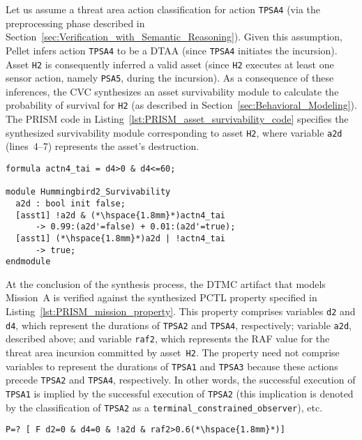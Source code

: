 Let us assume a threat area action classification for action \texttt{TPSA4} (via the preprocessing phase described in Section~\ref{sec:Verification_with_Semantic_Reasoning}). Given this assumption, Pellet infers action \texttt{TPSA4} to be a DTAA (since \texttt{TPSA4} initiates the incursion). Asset \texttt{H2} is consequently inferred a valid asset (since \texttt{H2} executes at least one sensor action, namely \texttt{PSA5}, during the incursion). As a consequence of these inferences, the CVC synthesizes an asset survivability module to calculate the probability of survival for \texttt{H2} (as described in Section~\ref{sec:Behavioral_Modeling}). The PRISM code in Listing~\ref{lst:PRISM_asset_survivability_code} specifies the synthesized survivability module corresponding to asset \texttt{H2}, where variable \texttt{a2d} (lines~4--7) represents the asset's destruction.

\begin{lstlisting}[caption={PRISM asset survivability code},label=lst:PRISM_asset_survivability_code]
formula actn4_tai = d4>0 & d4<=60;

module Hummingbird2_Survivability
  a2d : bool init false;
  [asst1] !a2d & (*\hspace{1.8mm}*)actn4_tai
      -> 0.99:(a2d'=false) + 0.01:(a2d'=true);
  [asst1] (*\hspace{1.8mm}*)a2d | !actn4_tai
      -> true;
endmodule
\end{lstlisting}

At the conclusion of the synthesis process, the DTMC artifact that models Mission~A is verified against the synthesized PCTL property specified in Listing~\ref{lst:PRISM_mission_property}. This property comprises variables \texttt{d2} and \texttt{d4}, which represent the durations of \texttt{TPSA2} and \texttt{TPSA4}, respectively; variable \texttt{a2d}, described above; and variable \texttt{raf2}, which represents the RAF value for the threat area incursion committed by asset~\texttt{H2}. The property need not comprise variables to represent the durations of \texttt{TPSA1} and \texttt{TPSA3} because these actions precede \texttt{TPSA2} and \texttt{TPSA4}, respectively. In other words, the successful execution of \texttt{TPSA1} is implied by the successful execution of \texttt{TPSA2} (this implication is denoted by the classification of \texttt{TPSA2} as a \texttt{terminal\_constrained\_observer}), etc.

\begin{lstlisting}[caption={PRISM mission property code},label=lst:PRISM_mission_property]
P=? [ F d2=0 & d4=0 & !a2d & raf2>0.6(*\hspace{1.8mm}*)]
\end{lstlisting}

